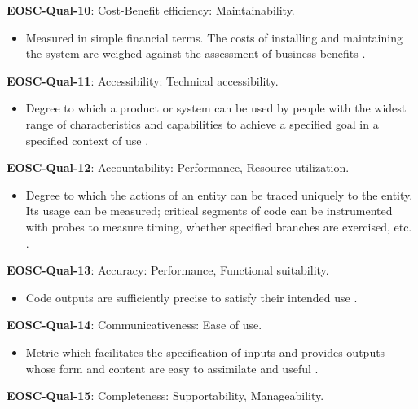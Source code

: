 \textbf{EOSC-Qual-10}: Cost-Benefit efficiency: Maintainability.

\begin{itemize}
    \item Measured in simple financial terms. The costs of installing and maintaining the system are weighed against the assessment of business benefits \cite{gillies_modelling_1992}.
\end{itemize}

\textbf{EOSC-Qual-11}: Accessibility: Technical accessibility.

\begin{itemize}
    \item Degree to which a product or system can be used by people with the widest range of characteristics and capabilities to achieve a specified goal in a specified context of use \cite{iso_25010_2011_2017,boehm_quantitative_1976}.
\end{itemize}

\textbf{EOSC-Qual-12}: Accountability: Performance, Resource utilization.

\begin{itemize}
    \item Degree to which the actions of an entity can be traced uniquely to the entity. Its usage can be measured; critical segments of code can be instrumented with probes to measure timing, whether specified branches are exercised, etc. \cite{iso_25010_2011_2017,boehm_quantitative_1976}.
\end{itemize}

\textbf{EOSC-Qual-13}: Accuracy: Performance, Functional suitability.

\begin{itemize}
    \item Code outputs are sufficiently precise to satisfy their intended use \cite{boehm_quantitative_1976}.
\end{itemize}

\textbf{EOSC-Qual-14}: Communicativeness: Ease of use.

\begin{itemize}
    \item Metric which facilitates the specification of inputs and provides outputs whose form and content are easy to assimilate and useful \cite{boehm_quantitative_1976,raymond_software_2013}.
\end{itemize}

\textbf{EOSC-Qual-15}: Completeness: Supportability, Manageability.

